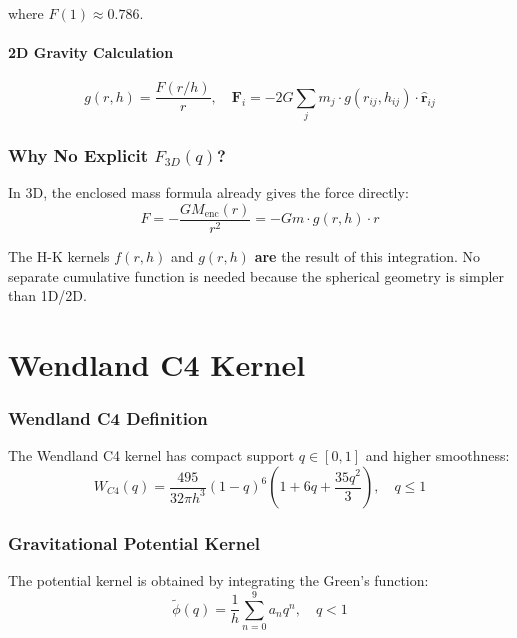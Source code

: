 \documentclass[12pt]{article}
\begin{document}
where $F(1) \approx 0.786$.

\subsection{2D Gravity Calculation}
\begin{equation}
\boxed{g(r, h) = \frac{F(r/h)}{r}, \quad \mathbf{F}_i = -2G \sum_j m_j \cdot g(r_{ij}, h_{ij}) \cdot \hat{\mathbf{r}}_{ij}}
\end{equation}

\section{Why No Explicit $F_{3D}(q)$?}

In 3D, the enclosed mass formula already gives the force directly:
\begin{equation}
F = -\frac{GM_{\text{enc}}(r)}{r^2} = -Gm \cdot g(r,h) \cdot r
\end{equation}

The H-K kernels $f(r,h)$ and $g(r,h)$ \textbf{are} the result of this integration.
No separate cumulative function is needed because the spherical geometry is
simpler than 1D/2D.

\part{Wendland C4 Kernel}

\section{Wendland C4 Definition}

The Wendland C4 kernel has compact support $q \in [0, 1]$ and higher smoothness:
\begin{equation}
W_{C4}(q) = \frac{495}{32\pi h^3} (1-q)^6 (1 + 6q + \frac{35q^2}{3}), \quad q \leq 1
\end{equation}

\section{Gravitational Potential Kernel}

The potential kernel is obtained by integrating the Green's function:
\begin{equation}
\tilde{\phi}(q) = \frac{1}{h} \sum_{n=0}^{9} a_n q^n, \quad q < 1
\end{equation}
\end{document}
